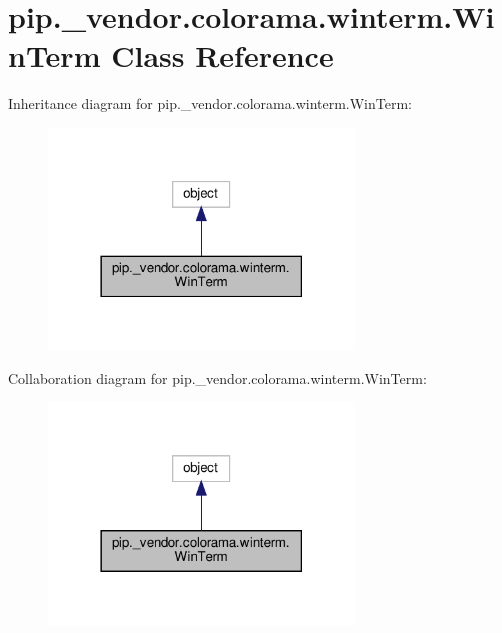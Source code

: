 \hypertarget{classpip_1_1__vendor_1_1colorama_1_1winterm_1_1WinTerm}{}\section{pip.\+\_\+vendor.\+colorama.\+winterm.\+Win\+Term Class Reference}
\label{classpip_1_1__vendor_1_1colorama_1_1winterm_1_1WinTerm}


Inheritance diagram for pip.\+\_\+vendor.\+colorama.\+winterm.\+Win\+Term\+:
\nopagebreak
\begin{figure}[H]
\begin{center}
\leavevmode
\includegraphics[width=230pt]{classpip_1_1__vendor_1_1colorama_1_1winterm_1_1WinTerm__inherit__graph}
\end{center}
\end{figure}


Collaboration diagram for pip.\+\_\+vendor.\+colorama.\+winterm.\+Win\+Term\+:
\nopagebreak
\begin{figure}[H]
\begin{center}
\leavevmode
\includegraphics[width=230pt]{classpip_1_1__vendor_1_1colorama_1_1winterm_1_1WinTerm__coll__graph}
\end{center}
\end{figure}
